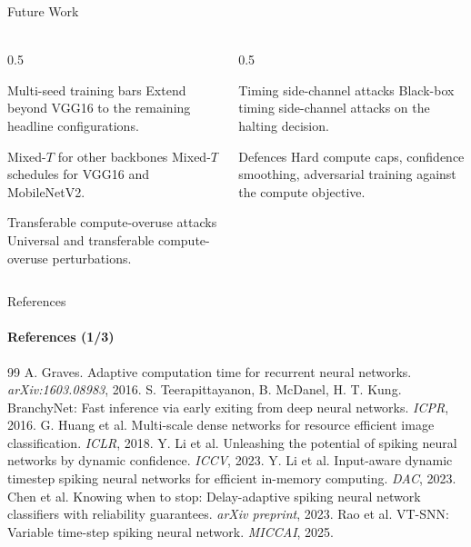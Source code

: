 \documentclass[aspectratio=169,11pt]{beamer}
\begin{document}
\begin{frame}{Future Work}\framesubtitle{}
\small
\begin{columns}[T]
\begin{column}{0.5\textwidth}
\begin{block}{Multi-seed training bars}
Extend beyond VGG16 to the remaining headline configurations.
\end{block}
\vspace{0.3em}
\begin{block}{Mixed-$T$ for other backbones}
Mixed-$T$ schedules for VGG16 and MobileNetV2.
\end{block}
\vspace{0.3em}
\begin{block}{Transferable compute-overuse attacks}
Universal and transferable compute-overuse perturbations.
\end{block}
\end{column}
\begin{column}{0.5\textwidth}
\begin{block}{Timing side-channel attacks}
Black-box timing side-channel attacks on the halting decision.
\end{block}
\vspace{0.3em}
\begin{block}{Defences}
Hard compute caps, confidence smoothing, adversarial training against the compute
objective.
\end{block}
\end{column}
\end{columns}
\end{frame}
\begin{frame}{References}
\framesubtitle{References (1/3)}
\small
\setlength{\itemsep}{2pt}
\begin{thebibliography}{99}
A. Graves. Adaptive computation time for recurrent neural networks.
\emph{arXiv:1603.08983}, 2016.
S. Teerapittayanon, B. McDanel, H. T. Kung.
BranchyNet: Fast inference via early exiting from deep neural networks.
\emph{ICPR}, 2016.
G. Huang et al.
Multi-scale dense networks for resource efficient image classification.
\emph{ICLR}, 2018.
Y. Li et al.
Unleashing the potential of spiking neural networks by dynamic confidence.
\emph{ICCV}, 2023.
Y. Li et al.
Input-aware dynamic timestep spiking neural networks for efficient
in-memory computing.
\emph{DAC}, 2023.
Chen et al.
Knowing when to stop: Delay-adaptive spiking neural network classifiers
with reliability guarantees.
\emph{arXiv preprint}, 2023.
Rao et al.
VT-SNN: Variable time-step spiking neural network.
\emph{MICCAI}, 2025.
\end{thebibliography}
\end{frame}
\end{document}
